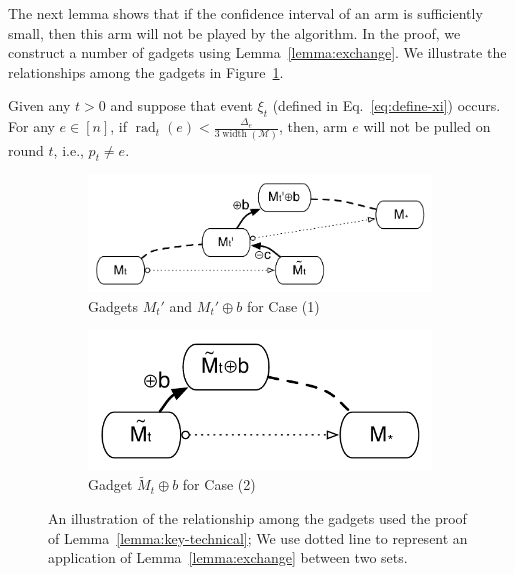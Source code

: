 \documentclass{article}
\newcommand{\M}{\mathcal M}
\newcommand{\B}{\mathcal B}
\DeclareMathOperator{\rank}{width}
\DeclareMathOperator{\rad}{rad}
\begin{document}
The next lemma shows that if the confidence interval of an arm is sufficiently small,  then this arm will not be played by the algorithm. 
In the proof, we construct a number of gadgets using Lemma~\ref{lemma:exchange}. We illustrate the relationships among the gadgets in Figure~\ref{fig:zzz-1}.
\begin{lemma}
\label{lemma:key-technical}
Given any $t>0$ and suppose that event $\xi_t$ (defined in Eq.~\eqref{eq:define-xi})  occurs.
For any $e\in [n]$, if $\rad_t(e) < \frac{\Delta_e}{3\rank(\M)}$, then, arm $e$ will not be pulled on round $t$, i.e., $p_t\not= e$.
\end{lemma}
\begin{figure}[t]
\centering
\begin{subfigure}[b]{0.55\textwidth}
	\includegraphics[width=\textwidth]{fig/interpolate-exp-1}
	\caption{Gadgets $M_t'$ and $M_t'\oplus b$ for Case (1)}
\end{subfigure}
\hspace{1em}
\begin{subfigure}[b]{0.35\textwidth}
	\includegraphics[width=\textwidth]{fig/interpolate-exp-2}
	\caption{Gadget $\tilde M_t\oplus b$ for Case (2)}
\end{subfigure}
\caption{An illustration of the relationship among the gadgets used the proof of Lemma~\ref{lemma:key-technical};
We use dotted line to represent an application of Lemma~\ref{lemma:exchange} between two sets.}
\label{fig:zzz-1}
\end{figure}
\end{document}

